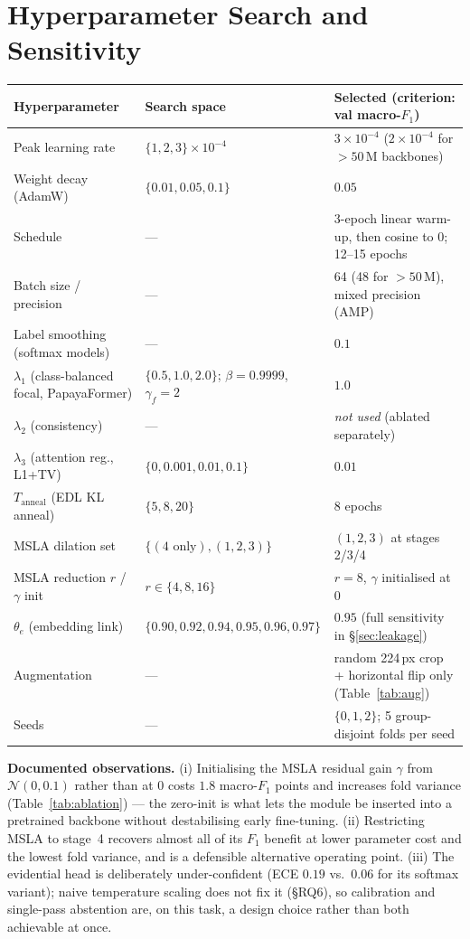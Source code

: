\documentclass[10pt,twocolumn,a4paper]{article}
\begin{document}
\section{Hyperparameter Search and Sensitivity}
\label{app:hparams}
\vspace{-2pt}
{\footnotesize
\begin{tabularx}{\textwidth}{@{}p{3.4cm} X p{3.6cm}@{}}
\toprule
\rowcolor{hdrgray}
Hyperparameter & Search space & Selected (criterion: val macro-$F_1$) \\
\midrule
Peak learning rate & $\{1,2,3\}\times10^{-4}$ & $3\times10^{-4}$ ($2\times10^{-4}$ for $>50$\,M backbones) \\
Weight decay (AdamW) & $\{0.01, 0.05, 0.1\}$ & $0.05$ \\
Schedule & --- & 3-epoch linear warm-up, then cosine to $0$; 12--15 epochs \\
Batch size / precision & --- & 64 (48 for $>50$\,M), mixed precision (AMP) \\
Label smoothing (softmax models) & --- & $0.1$ \\
$\lambda_1$ (class-balanced focal, PapayaFormer) & $\{0.5, 1.0, 2.0\}$; $\beta{=}0.9999$, $\gamma_f{=}2$ & $1.0$ \\
$\lambda_2$ (consistency) & --- & \emph{not used} (ablated separately) \\
$\lambda_3$ (attention reg., L1+TV) & $\{0, 0.001, 0.01, 0.1\}$ & $0.01$ \\
$T_{\text{anneal}}$ (EDL KL anneal) & $\{5, 8, 20\}$ & $8$ epochs \\
MSLA dilation set & $\{(4\text{ only}),(1,2,3)\}$ & $(1,2,3)$ at stages 2/3/4 \\
MSLA reduction $r$ / $\gamma$ init & $r\in\{4,8,16\}$ & $r{=}8$, $\gamma$ initialised at $0$ \\
$\theta_e$ (embedding link) & $\{0.90,0.92,0.94,0.95,0.96,0.97\}$ & $0.95$ (full sensitivity in \S\ref{sec:leakage}) \\
Augmentation & --- & random 224\,px crop + horizontal flip only (Table~\ref{tab:aug}) \\
Seeds & --- & $\{0,1,2\}$; 5 group-disjoint folds per seed \\
\bottomrule
\end{tabularx}

\vspace{6pt}
\noindent\textbf{Documented observations.} (i) Initialising the MSLA residual gain $\gamma$ from $\mathcal{N}(0,0.1)$ rather than at $0$ costs $1.8$ macro-$F_1$ points and increases fold variance (Table~\ref{tab:ablation}) --- the zero-init is what lets the module be inserted into a pretrained backbone without destabilising early fine-tuning. (ii) Restricting MSLA to stage~4 recovers almost all of its $F_1$ benefit at lower parameter cost and the lowest fold variance, and is a defensible alternative operating point. (iii) The evidential head is deliberately under-confident (ECE $0.19$ vs.\ $0.06$ for its softmax variant); naive temperature scaling does not fix it (\S RQ6), so calibration and single-pass abstention are, on this task, a design choice rather than both achievable at once.}
\end{document}
